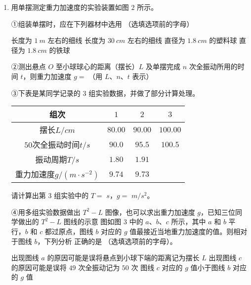 \begin{enumerate}
\newpage
\item 
{}
用单摆测定重力加速度的实验装置如图 $ 2 $
所示。
\begin{figure}[h!]
\centering

\end{figure}



①组装单摆时，应在下列器材中选用
（选填选项前的字母）

\fourchoices
{长度为 $ 1 \ m $ 左右的细线}
{长度为 $ 30 \ cm $ 左右的细线}
{直径为 $ 1.8 \ cm $ 的塑料球}
{直径为 $ 1.8 \ cm $ 的铁球}

②测出悬点 $ O $ 至小球球心的距离（摆长）$ L $ 及单摆完成 $ n $ 次全振动所用的时间 $ t $，则重力加速度
$ g= $  （用 $ L $、$ n $、$ t $ 表示）


③下表是某同学记录的 $ 3 $ 组实验数据，并做了部分计算处理。
\begin{table}[h!]
\centering 
\begin{tabular}{|c|c|c|c|}
\hline 
组次 & $ 1 $ & $ 2 $ & $ 3 $
 \\
\hline
摆长$ L/cm $ & $ 80.00 $ & $ 90.00 $ & $ 100.00 $
 \\
\hline
$ 50 $次全振动时间$ t/s $ & $ 90.0 $ & $ 95.5 $ & $ 100.5 $
 \\
\hline
振动周期$ T/s $ & $ 1.80 $ & $ 1.91 $ & 
 \\
\hline
重力加速度$ g/(m \cdot s^{-2}) $ & $ 9.74 $ & $ 9.73 $ & \\ 
\hline 
\end{tabular}
\end{table} 




请计算出第 $ 3 $ 组实验中的 $ T=$  $s $，$ g=$  $m/s^{2} $。




④用多组实验数据做出 $ T^{2} -L $ 图像，也可以求出重力加速度 $ g $，已知三位同学做出的 $ T^{2} -L $ 图线的示意
图如图 $ 3 $ 中的 $ a $、$ b $、$ c $ 所示，其中 $ a $ 和 $ b $ 平行，$ b $ 和 $ c $ 都过原点，图线
$ b $ 对应的 $ g $ 值最接近当地重力加速度的值。则相对于图线 $ b $，下列分析
正确的是  （选填选项前的字母）。
\begin{figure}[h!]
\centering

\end{figure}

\threechoices
{出现图线 $ a $ 的原因可能是误将悬点到小球下端的距离记为摆长 $ L $}
{出现图线 $ c $ 的原因可能是误将 $ 49 $ 次全振动记为 $ 50 $ 次}
{图线 $ c $ 对应的 $ g $ 值小于图线 $ b $ 对应的 $ g $ 值}



\end{enumerate}
